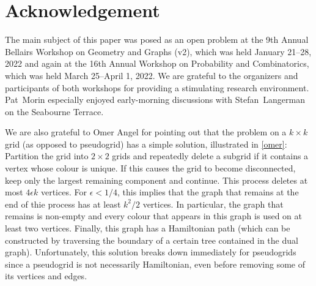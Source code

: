\documentclass{patmorin}
\begin{document}
\section*{Acknowledgement}

The main subject of this paper was posed as an open problem at the 9th Annual Bellairs Workshop on Geometry and Graphs (v2), which was held January 21--28, 2022 and again at the 16th Annual Workshop on Probability and Combinatorics, which was held March 25--April 1, 2022. We are grateful to the organizers and participants of both workshops for providing a stimulating research environment.
Pat~Morin especially enjoyed early-morning discussions with Stefan~Langerman on the Seabourne Terrace.

We are also grateful to Omer Angel for pointing out that the problem on a $k\times k$ grid (as opposed to pseudogrid) has a simple solution, illustrated in \cref{omer}: Partition the grid into $2\times 2$ grids and repeatedly delete a subgrid if it contains a vertex whose colour is unique.  If this causes the grid to become disconnected, keep only the largest remaining component and continue.  This process deletes at most $4\epsilon k$ vertices.  For $\epsilon < 1/4$, this implies that the graph that remains at the end of thie process has at least $k^2/2$ vertices.  In particular, the graph that remains is non-empty and every colour that appears in this graph is used on at least two vertices.  Finally, this graph has a Hamiltonian path (which can be constructed by traversing the boundary of a certain tree contained in the dual graph).  Unfortunately, this solution breaks down immediately for pseudogrids since a pseudogrid is not necessarily Hamiltonian, even before removing some of its vertices and edges.
\end{document}
